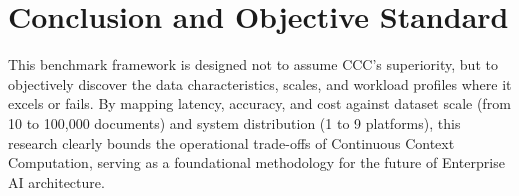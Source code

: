 \section{Conclusion and Objective Standard}
\label{sec:conclusion}
This benchmark framework is designed not to assume CCC's superiority, but to objectively discover the data characteristics, scales, and workload profiles where it excels or fails. By mapping latency, accuracy, and cost against dataset scale (from 10 to 100,000 documents) and system distribution (1 to 9 platforms), this research clearly bounds the operational trade-offs of Continuous Context Computation, serving as a foundational methodology for the future of Enterprise AI architecture.
